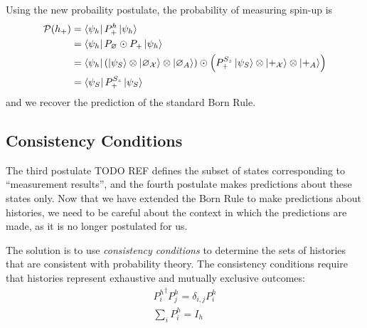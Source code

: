Using the new probaility postulate, the probability of measuring spin-up is
\begin{align}
    \mathcal{P}(h_+) &= \bra{\psi_h} P^h_+ \ket{\psi_h} \\ \nonumber
    &= \bra{\psi_h} P_\varnothing \odot P_+ \ket{\psi_h} \\ \nonumber
    &=  \bra{\psi_h}  \left(\ket{\psi_S} \otimes \ket{\varnothing_\mathcal{X}} \otimes \ket{\varnothing_A} \right)\odot \left(P^{S_z}_+\ket{\psi_S} \otimes \ket{+_\mathcal{X}} \otimes \ket{+_A} \right) \\ \nonumber
    &= \bra{\psi_S} P^{S_z}_+ \ket{\psi_S}
\end{align}
and we recover the prediction of the standard Born Rule.

\subsection{Consistency Conditions}

The third postulate TODO REF defines the subset of states corresponding to ``measurement results'', and the fourth postulate makes predictions about these states only. Now that we have extended the Born Rule to make predictions about histories, we need to be careful about the context in which the predictions are made, as it is no longer postulated for us.



The solution is to use \textit{consistency conditions} to determine the sets of histories that are consistent with probability theory. The consistency conditions require that histories represent exhaustive and mutually exclusive outcomes:
\begin{align}
  {P^h_i}^\dagger P^h_j = \delta_{i,j} P^h_i \\
  \sum_i P^h_i = I_h
\end{align}

